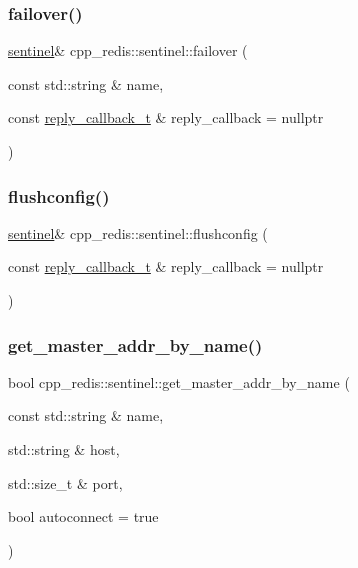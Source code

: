 \subsubsection{\texorpdfstring{failover()}{failover()}}
{\footnotesize\ttfamily \hyperlink{classcpp__redis_1_1sentinel}{sentinel}\& cpp\+\_\+redis\+::sentinel\+::failover (\begin{DoxyParamCaption}\item[{const std\+::string \&}]{name,  }\item[{const \hyperlink{classcpp__redis_1_1sentinel_ae1a150ff8787208c47414397a061c9a7}{reply\+\_\+callback\+\_\+t} \&}]{reply\+\_\+callback = {\ttfamily nullptr} }\end{DoxyParamCaption})}

\mbox{\label{classcpp__redis_1_1sentinel_ab3c3a6822ebd512217280b0ca1a0f29f}} 
\subsubsection{\texorpdfstring{flushconfig()}{flushconfig()}}
{\footnotesize\ttfamily \hyperlink{classcpp__redis_1_1sentinel}{sentinel}\& cpp\+\_\+redis\+::sentinel\+::flushconfig (\begin{DoxyParamCaption}\item[{const \hyperlink{classcpp__redis_1_1sentinel_ae1a150ff8787208c47414397a061c9a7}{reply\+\_\+callback\+\_\+t} \&}]{reply\+\_\+callback = {\ttfamily nullptr} }\end{DoxyParamCaption})}

\mbox{\label{classcpp__redis_1_1sentinel_a2886493b40b00dfafdd3b22dfe28e0c3}} 
\subsubsection{\texorpdfstring{get\+\_\+master\+\_\+addr\+\_\+by\+\_\+name()}{get\_master\_addr\_by\_name()}}
{\footnotesize\ttfamily bool cpp\+\_\+redis\+::sentinel\+::get\+\_\+master\+\_\+addr\+\_\+by\+\_\+name (\begin{DoxyParamCaption}\item[{const std\+::string \&}]{name,  }\item[{std\+::string \&}]{host,  }\item[{std\+::size\+\_\+t \&}]{port,  }\item[{bool}]{autoconnect = {\ttfamily true} }\end{DoxyParamCaption})}

